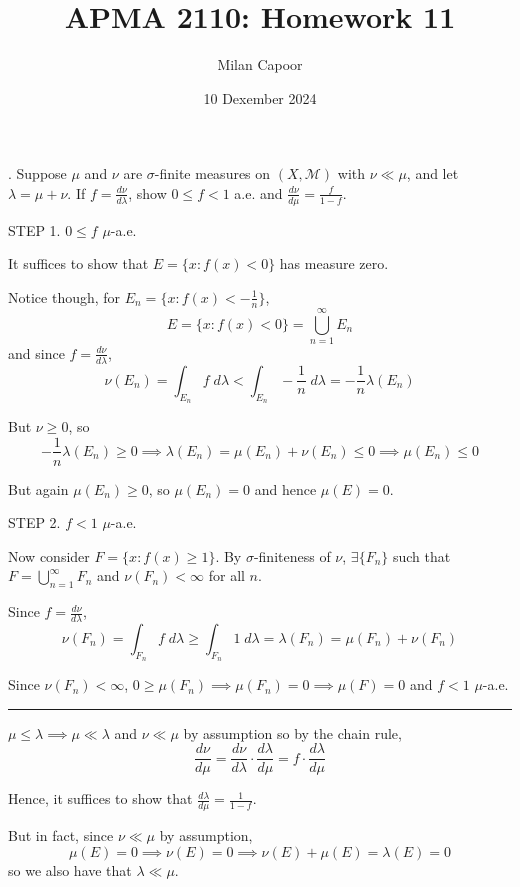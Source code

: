 \documentclass[12pt]{article}
\title{APMA 2110: Homework 11}
\author{Milan Capoor}
\date{10 Dexember 2024}
\newcommand{\M}{\mathcal{M}}
\renewcommand{\div}{\vspace*{10pt}\hrule\vspace*{10pt}}
\begin{document}
. Suppose $\mu$ and $\nu$ are $\sigma$-finite measures on $(X, \M)$ with $\nu \ll \mu$, and let $\lambda = \mu + \nu$. If $f = \frac{d\nu}{d\lambda}$, show $0 \leq f < 1$ a.e. and $\frac{d\nu}{d\mu} = \frac{f}{1 - f}$.  

    \color{blue}
        STEP 1. $0 \leq f$ $\mu$-a.e.

        It suffices to show that $E = \{x: f(x) < 0\}$ has measure zero.

        Notice though, for $E_n = \{x: f(x) < -\frac{1}{n}\}$,
        \[E = \{x: f(x) < 0\} = \bigcup_{n=1}^\infty E_n\]
        and since $f = \frac{d\nu}{d\lambda}$,
        \[\nu(E_n) = \int_{E_n} f \; d\lambda < \int_{E_n} -\frac{1}{n} \; d\lambda = -\frac{1}{n} \lambda(E_n)\]

        But $\nu \geq 0$, so
        \[-\frac{1}{n}\lambda(E_n) \geq 0 \implies \lambda(E_n) = \mu(E_n) + \nu(E_n) \leq 0 \implies \mu(E_n) \leq 0\]

        But again $\mu(E_n) \geq 0$, so $\mu(E_n) = 0$ and hence $\mu(E) = 0$.
        
        STEP 2. $f < 1$ $\mu$-a.e.

        Now consider $F = \{x: f(x) \geq 1\}$. By $\sigma$-finiteness of $\nu$, $\exists \{F_n\}$ such that $F = \bigcup_{n=1}^\infty F_n$ and $\nu(F_n) < \infty$ for all $n$.

        Since $f = \frac{d\nu}{d\lambda}$,
        \[\nu(F_n) = \int_{F_n} f \; d\lambda \geq \int_{F_n} 1 \; d\lambda = \lambda(F_n) = \mu(F_n) + \nu(F_n)\]

        Since $\nu(F_n) < \infty$, $0 \geq \mu(F_n) \implies \mu(F_n) = 0 \implies \mu(F) = 0$ and $f < 1$ $\mu$-a.e.

        \div 

        $\mu \leq \lambda \implies \mu \ll \lambda$ and $\nu \ll \mu$ by assumption so by the chain rule, 
        \[\frac{d\nu}{d\mu} = \frac{d\nu}{d\lambda} \cdot \frac{d\lambda}{d\mu} = f \cdot \frac{d\lambda}{d\mu}\]

        Hence, it suffices to show that $\frac{d\lambda}{d\mu} = \frac{1}{1 - f}$. 

        But in fact, since $\nu \ll \mu$ by assumption, 
        \[\mu(E) = 0 \implies \nu(E) = 0 \implies \nu(E) + \mu(E) = \lambda(E) = 0\] 
        so we also have that $\lambda \ll \mu$.
\end{document}
